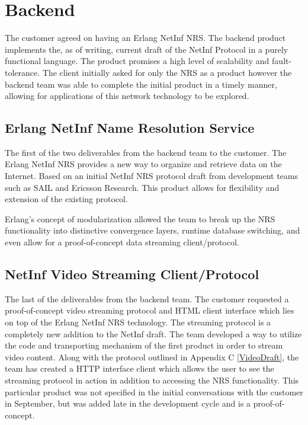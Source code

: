 \section {Backend}

The customer agreed on having an Erlang NetInf NRS. The backend product implements the, as of writing, current draft of the NetInf Protocol\cite{netinfproto} in a purely functional language. The product promises a high level of scalability and fault-tolerance. The client initially asked for only the NRS as a product however the backend team was able to complete the initial product in a timely manner, allowing for applications of this network technology to be explored. 


\subsection {Erlang NetInf Name Resolution Service}
The first of the two deliverables from the backend team to the customer. The Erlang NetInf NRS provides a new way to organize and retrieve data on the Internet. Based on an initial NetInf NRS protocol draft from development teams such as SAIL and Ericsson Research\cite{netinfproto}. This product allows for flexibility and extension of the existing protocol.

Erlang's concept of modularization allowed the team to break up the NRS functionality into distinctive convergence layers, runtime database switching, and even allow for a proof-of-concept data streaming client/protocol. 

\subsection{NetInf Video Streaming Client/Protocol}

The last of the deliverables from the backend team. The customer requested a proof-of-concept video streaming protocol and HTML client interface which lies on top of the Erlang NetInf NRS technology. The streaming protocol is a completely new addition to the NetInf draft\cite{netinfproto}. The team developed a way to utilize the code and transporting mechanism of the first product in order to stream video content. Along with the protocol outlined in Appendix C \ref{VideoDraft}, the team has created a HTTP interface client which allows the user to see the streaming protocol in action in addition to accessing the NRS functionality. This particular product was not specified in the initial conversations with the customer in September, but was added late in the development cycle and is a proof-of-concept.

